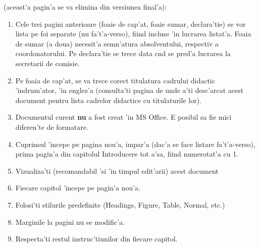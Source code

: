 {\color{red}{\bf De citit 'inainte} (aceast'a pagin'a se va elimina din versiunea final'a)}:
\begin{enumerate}
 \item Cele trei pagini anterioare (foaie de cap'at, foaie sumar, declara'tie) se vor lista pe foi separate (nu fa't'a-verso), fiind incluse 'in lucrarea listat'a. 
 Foaia de sumar (a doua) necesit'a semn'atura absolventului, respectiv a coordonatorului.
 Pe declara'tie se trece data c\ia nd se pred'a lucrarea la secretarii de comisie.
 \item Pe foaia de cap'at, se va trece corect titulatura cadrului didactic 'indrum'ator, 'in englez'a (consulta'ti pagina de unde a'ti desc'arcat acest document pentru lista cadrelor didactice cu titulaturile lor).
 \item Documentul curent {\bf nu} a fost creat 'in MS Office. E posibil sa fie mici diferen'te de formatare. 
\item Cuprinsul 'incepe pe pagina nou'a, impar'a (dac'a se face listare fa't'a-verso), prima pagin'a din capitolul Introducere tot a'sa, fiind numerotat'a cu 1. %
\item Vizualiza'ti (recomandabil 'si 'in timpul edit'arii) acest document %
\item Fiecare capitol 'incepe pe pagin'a nou'a. %
\item Folosi'ti stilurile predefinite (Headings, Figure, Table, Normal, etc.)
\item Marginile la pagini nu se modific'a.
\item Respecta'ti restul instruc'tiunilor din fiecare capitol.
\end{enumerate}
\thispagestyle{empty}
